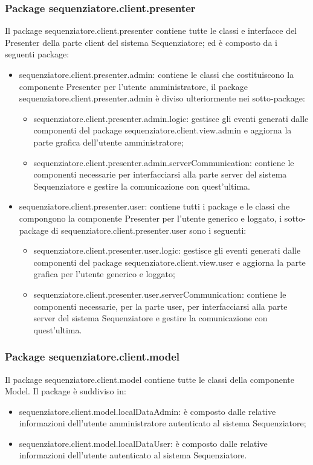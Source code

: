 \subsubsection{Package sequenziatore.client.presenter}
Il package sequenziatore.client.presenter contiene tutte le classi e interfacce del Presenter della 
parte client del sistema Sequenziatore; ed è composto da i seguenti package:
\begin{itemize}
	\item sequenziatore.client.presenter.admin: contiene le classi che costituiscono la componente Presenter
per l’utente amministratore, il package sequenziatore.client.presenter.admin è diviso ulteriormente nei sotto-package:
	\begin{itemize}
		\item sequenziatore.client.presenter.admin.logic: gestisce gli eventi generati dalle componenti del package
sequenziatore.client.view.admin e aggiorna la parte grafica dell'utente amministratore;
		\item sequenziatore.client.presenter.admin.serverCommunication: contiene le componenti necessarie per interfacciarsi alla parte server del sistema Sequenziatore e gestire la comunicazione con quest'ultima.
	\end{itemize}
	\item sequenziatore.client.presenter.user: contiene tutti i package e le classi che compongono la componente Presenter
per l’utente generico e loggato, i sotto-package di sequenziatore.client.presenter.user sono i seguenti:
	\begin{itemize}
		\item sequenziatore.client.presenter.user.logic: gestisce gli eventi generati dalle componenti del package
sequenziatore.client.view.user e aggiorna la parte grafica per l'utente generico e loggato;
		\item sequenziatore.client.presenter.user.serverCommunication: contiene le componenti necessarie, per la parte user, per interfacciarsi alla parte server del sistema Sequenziatore e gestire la comunicazione con quest'ultima.
	\end{itemize}
\end{itemize}
\subsubsection{Package sequenziatore.client.model}
Il package sequenziatore.client.model contiene tutte le classi della componente Model. 
Il package è suddiviso in:
\begin{itemize}
	\item sequenziatore.client.model.localDataAdmin: è composto dalle relative informazioni dell'utente amministratore autenticato al sistema Sequenziatore;
	\item sequenziatore.client.model.localDataUser: è composto dalle relative informazioni dell'utente autenticato al sistema Sequenziatore.
\end{itemize}
